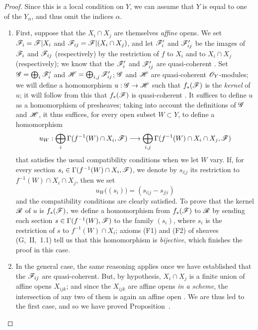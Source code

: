 \begin{proof}
\label{proof-1.9.2.1}
Since this is a local condition on $Y$, we can assume that $Y$ is equal to one
of the $Y_\alpha$, and thus omit the indices $\alpha$.
\begin{enumerate}[label=(\alph*)]
  \item First, suppose that the $X_i\cap X_j$
    are themselves \emph{affine} opens. We set $\mathscr{F}_i=\mathscr{F}|X_i$ and
    $\mathscr{F}_{ij}=\mathscr{F}|(X_i\cap X_j)$, and let $\mathscr{F}'_i$ and
    $\mathscr{F}'_{ij}$ be the images of $\mathscr{F}_i$ and $\mathscr{F}_{ij}$
    (respectively) by the restriction of $f$ to $X_i$ and to $X_i\cap X_j$
    (respectively); we know that the $\mathscr{F}'_i$ and $\mathscr{F}'_{ij}$ are
    quasi-coherent . Set $\mathscr{G}=\bigoplus_i\mathscr{F}'_i$ and
    $\mathscr{H}=\bigoplus_{i,j}\mathscr{F}'_{ij}$; $\mathscr{G}$ and $\mathscr{H}$ are
    quasi-coherent $\mathscr{O}_Y$-modules; we will define a homomorphism
    $u:\sh{G}\to\sh{H}$ such that $f_*(\mathscr{F})$ is the
    \emph{kernel} of $u$; it will follow from this that $f_*(\mathscr{F})$ is
    quasi-coherent . It suffices to define $u$ as
    a homomorphism of presheaves; taking into account the definitions of $\mathscr{G}$
    and $\mathscr{H}$, it thus suffices, for every open subset $W\subset Y$, to define a
    homomorphism
    \[
      u_W:\bigoplus_i\Gamma(f^{-1}(W)\cap X_i,\sh{F})\to\bigoplus_{i,j}\Gamma(f^{-1}(W)\cap X_i\cap X_j,\sh{F})
    \]
    that satisfies the usual compatibility conditions when we let $W$ vary.
    If, for every section $s_i\in\Gamma(f^{-1}(W)\cap X_i,\mathscr{F})$, we denote by $s_{i|j}$ its restriction to $f^{-1}(W)\cap X_i\cap X_j$, then we set
    \[
      u_W\big((s_i)\big)=(s_{i|j}-s_{j|i})
    \]
    and the compatibility conditions are clearly satisfied.
    To prove that the kernel $\mathscr{R}$ of $u$ is $f_*(\mathscr{F})$, we define a homomorphism from $f_*(\mathscr{F})$ to $\mathscr{R}$ by sending each section $s\in\Gamma(f^{-1}(W),\mathscr{F})$ to the family $(s_i)$, where $s_i$ is the restriction of $s$ to $f^{-1}(W)\cap X_i$; axioms (F1) and (F2) of sheaves (G,~II,~1.1) tell us that this homomorphism is \emph{bijective}, which finishes the proof in this case.
  \item In the general case, the same reasoning applies once we have established that the $\mathscr{F}_{ij}$ are quasi-coherent.
    But, by hypothesis, $X_i\cap X_j$ is a finite union of affine opens $X_{ijk}$; and since the $X_{ijk}$ are affine opens \emph{in a scheme}, the intersection of any two of them is again an affine open . We are thus led to the first case, and so we have proved Proposition~.
\end{enumerate}
\end{proof}

